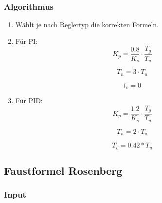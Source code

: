 \subsubsection*{Algorithmus}
\begin{enumerate}
    \item
        W\"ahlt je nach Reglertyp die korrekten Formeln.
    \item
        F\"ur PI:
        \begin{equation*}
             K_p= \frac{0.8}{K_s} \cdot \frac{T_g}{T_u}
        \end{equation*}

        \begin{equation*}
             T_n=3 \cdot T_u
        \end{equation*}

        \begin{equation*}
              t_v=0
        \end{equation*}
    \item
        F\"ur PID:
        \begin{equation*}
            K_p = \frac{1.2}{K_s} \cdot \frac{T_g}{T_u}
        \end{equation*}

        \begin{equation*}
            T_n=2 \cdot T_u
        \end{equation*}

        \begin{equation*}
            T_v=0.42*T_u
        \end{equation*}
\end{enumerate}

%


\clearpage
\subsection{Faustformel Rosenberg}
\label{app:algo:rosenberg}

\subsubsection*{Input}

